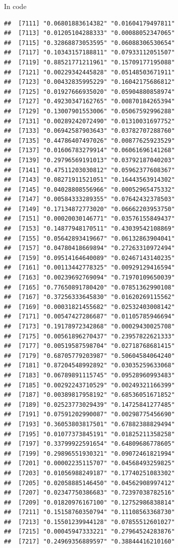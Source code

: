 \documentclass[ignorenonframetext,]{beamer}
\begin{document}
\begin{frame}[fragile]{In code}
\begin{verbatim}
##  [7111] "0.06801883614382" "0.01604179497811"
##  [7113] "0.01205104288333" "0.00088052347065"
##  [7115] "0.32868873053595" "0.06088306530654"
##  [7117] "0.10343157188811" "0.07933112051507"
##  [7119] "0.88521771211961" "0.15709177195088"
##  [7121] "0.00229342445828" "0.05148503671911"
##  [7123] "0.00432835995229" "0.16042175686812"
##  [7125] "0.01927666935020" "0.05904880858974"
##  [7127] "0.49230347162765" "0.00870184265394"
##  [7129] "0.13007901553006" "0.05067592996288"
##  [7131] "0.00289242072490" "0.01310031697752"
##  [7133] "0.06942587903643" "0.03782707288760"
##  [7135] "0.44786407497026" "0.00877625923529"
##  [7137] "0.01606783279914" "0.06061696141268"
##  [7139] "0.29796569191013" "0.03792187040203"
##  [7141] "0.47511203030812" "0.05962377608367"
##  [7143] "0.08271911521051" "0.16443563914302"
##  [7145] "0.04028808556966" "0.00052965475332"
##  [7147] "0.00584333289355" "0.07642432378503"
##  [7149] "0.17134872773020" "0.06662203953750"
##  [7151] "0.00020030146771" "0.03576155849437"
##  [7153] "0.14877948170511" "0.43039542108869"
##  [7155] "0.05642893419667" "0.06132863904041"
##  [7157] "0.04780418669894" "0.27263310972494"
##  [7159] "0.09514164640089" "0.02467143140235"
##  [7161] "0.00113442778325" "0.00929129416594"
##  [7163] "0.00239692769094" "0.71970109650039"
##  [7165] "0.77650891780420" "0.07851362990108"
##  [7167] "0.37256333645830" "0.01620269115562"
##  [7169] "0.00031821455682" "0.02532403008142"
##  [7171] "0.00547427286687" "0.01105785946694"
##  [7173] "0.19178972342868" "0.00029430025708"
##  [7175] "0.00561896270437" "0.23957822621333"
##  [7177] "0.00519587598704" "0.02718768681415"
##  [7179] "0.68705779203987" "0.50604584064240"
##  [7181] "0.87204548992892" "0.03035259633068"
##  [7183] "0.06789891115745" "0.09528960993483"
##  [7185] "0.00292243710529" "0.00249321166399"
##  [7187] "0.00389817958192" "0.68536051671852"
##  [7189] "0.02523773029439" "0.14725841277485"
##  [7191] "0.07591202990087" "0.00298775456690"
##  [7193] "0.36053803817501" "0.67882388829494"
##  [7195] "0.01077373845191" "0.01825211358258"
##  [7197] "0.33799922591654" "0.64809686778605"
##  [7199] "0.29896551930321" "0.09072461821994"
##  [7201] "0.00002235115707" "0.04568493259825"
##  [7203] "0.01056988249187" "0.17740251083302"
##  [7205] "0.02058885146450" "0.04562908997412"
##  [7207] "0.02347750386683" "0.72397038782516"
##  [7209] "0.01820976167100" "0.12752986838814"
##  [7211] "0.15158760350794" "0.11108563368730"
##  [7213] "0.15501239944128" "0.07855512601027"
##  [7215] "0.00045947333221" "0.27964524283876"
##  [7217] "0.24969356889597" "0.38844416210160"

\end{verbatim}
\end{frame}
\end{document}
